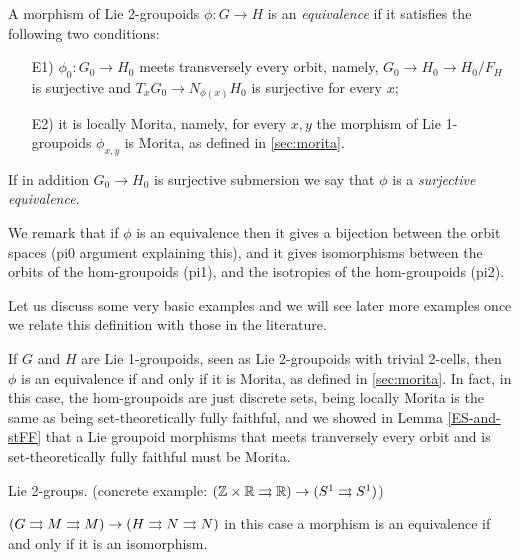 \begin{mydef}
A morphism of Lie 2-groupoids $\phi\colon G\to H$ is an \emph{equivalence} if it satisfies the following two conditions:
\begin{enumerate}
\item[E1)] $\phi_0\colon G_0\to H_0$ meets transversely every orbit, namely, $G_0\to H_0\to H_0/F_H$ is surjective and $T_xG_0\to N_{\phi(x)}H_0$ is surjective for every $x$;
\item[E2)] it is locally Morita, namely, for every $x,y$ the morphism of Lie 1-groupoids $\phi_{x,y}$ is Morita, as defined in \textsection \ref{sec:morita}.
\end{enumerate}
If in addition $G_0\to H_0$ is surjective submersion we say that $\phi$ is a \emph{surjective equivalence}.
\end{mydef}

We remark that if $\phi$ is an equivalence then it gives a bijection between the orbit spaces (pi0 argument explaining this), and it gives isomorphisms between the orbits of the hom-groupoids (pi1), and the isotropies of the hom-groupoids (pi2).

Let us discuss some very basic examples and we will see later more examples once we relate this definition with those in the literature.

\begin{example}
If $G$ and $H$ are Lie 1-groupoids, seen as Lie 2-groupoids with trivial 2-cells, then $\phi$ is an equivalence if and only if it is Morita, as defined in \textsection\ref{sec:morita}.
  In fact, in this case, the hom-groupoids are just discrete sets, being locally Morita is the same as being set-theoretically fully faithful, and we showed in Lemma \ref{ES-and-stFF} that a Lie groupoid morphisms that meets tranversely every orbit and is set-theoretically fully faithful must be Morita.
\end{example}

\begin{example}
Lie 2-groups. (concrete example: $(\mathbb Z\times\mathbb R\rightrightarrows\mathbb R)\to (S^1\rightrightarrows S^1)$)
\end{example}

\begin{example}
$(G\rightrightarrows M\rightrightarrows M)\to (H\rightrightarrows N\rightrightarrows N)$ in this case a morphism is an equivalence if and only if it is an isomorphism.
\end{example}

